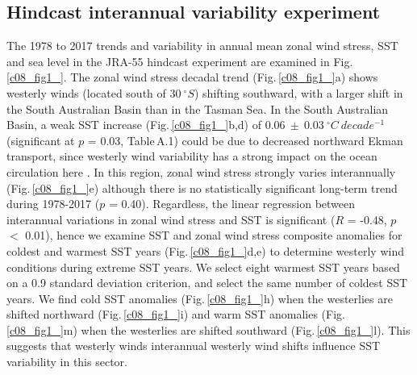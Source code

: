 \documentclass[draft,linenumbers]{agujournal2018}
\begin{document}
\subsection{Hindcast interannual variability experiment}
The 1978 to 2017 trends and variability in annual mean zonal wind stress, SST and sea level in the JRA-55 hindcast experiment are examined in Fig.\,\ref{c08_fig1_}. The zonal wind stress decadal trend (Fig.\,\ref{c08_fig1_}a) shows westerly winds (located south of $30\ ^{\circ}S$) shifting southward, with a larger shift in the South Australian Basin than in the Tasman Sea. In the South Australian Basin, a weak SST increase (Fig.\,\ref{c08_fig1_}b,d) of $0.06\ \pm\ 0.03\ ^{\circ}C\ decade^{-1}$ (significant at $p$ = 0.03, Table\,A.1) could be due to decreased northward Ekman transport, since westerly wind variability has a strong impact on the ocean circulation here \citep{Middleton2007}. In this region, zonal wind stress strongly varies interannually (Fig.\,\ref{c08_fig1_}e) although there is no statistically significant long-term trend during 1978-2017 ($p$ = 0.40). Regardless, the linear regression between interannual variations in zonal wind stress and SST is significant ($R$ = -0.48, $p$ $<$ 0.01), hence we examine SST and zonal wind stress composite anomalies for coldest and warmest SST years (Fig.\,\ref{c08_fig1_}d,e) to determine westerly wind conditions during extreme SST years. We select eight warmest SST years based on a 0.9 standard deviation criterion, and select the same number of coldest SST years. We find cold SST anomalies (Fig.\,\ref{c08_fig1_}h) when the westerlies are shifted northward (Fig.\,\ref{c08_fig1_}i) and warm SST anomalies (Fig.\,\ref{c08_fig1_}m) when the westerlies are shifted southward (Fig.\,\ref{c08_fig1_}l). This suggests that westerly winds interannual westerly wind shifts influence SST variability in this sector. 
\end{document}
